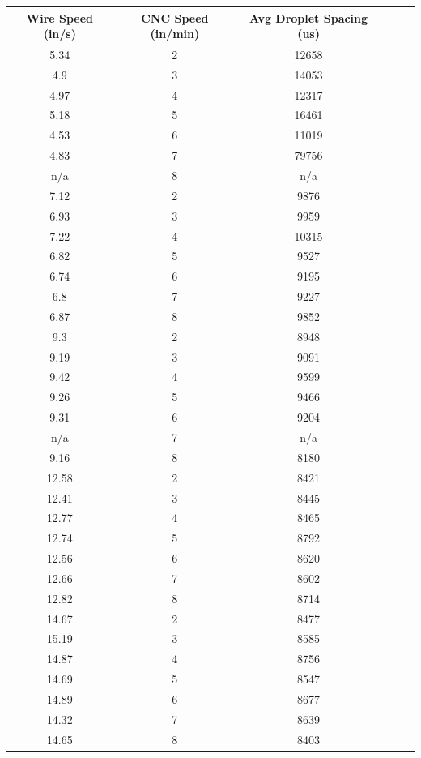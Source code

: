 \documentclass[12pt]{article}
\begin{document}
\begin{center}

\begin{tabular}{ |c|c|c|c|c|c| }


  \hline
  \textbf{Wire Speed (in/s)} & \textbf{CNC Speed (in/min)} & \textbf{Avg Droplet Spacing (us)} \\ \hline
5.34 &	2 &	12658 \\ \hline
4.9	& 3 &	14053 \\ \hline
4.97 &	4 &	12317 \\ \hline
5.18 &	5 &	16461 \\ \hline
4.53 &	6 &	11019 \\ \hline
4.83 &	7 &	79756 \\ \hline
n/a &	8 &	n/a \\ \hline \hline
7.12 &	2 &	9876 \\ \hline
6.93 &	3 &	9959 \\ \hline
7.22 &	4 &	10315 \\ \hline
6.82 &	5 &	9527 \\ \hline
6.74 &	6 &	9195 \\ \hline
6.8 &	7 &	9227 \\ \hline
6.87 &	8 &	9852 \\ \hline \hline
9.3 &	2 &	8948 \\ \hline
9.19 &	3 &	9091 \\ \hline
9.42 &	4 &	9599 \\ \hline
9.26 &	5 &	9466 \\ \hline
9.31 &	6 &	9204 \\ \hline
n/a &	7 &	n/a \\ \hline
9.16 &	8 &	8180 \\ \hline \hline
12.58 &	2 &	8421 \\ \hline
12.41 &	3 &	8445 \\ \hline
12.77 &	4 &	8465 \\ \hline
12.74 &	5 &	8792 \\ \hline
12.56 &	6 &	8620 \\ \hline
12.66 &	7 &	8602 \\ \hline
12.82 &	8 &	8714 \\ \hline \hline
14.67 &	2 &	8477 \\ \hline
15.19 &	3 &	8585 \\ \hline
14.87 &	4 &	8756 \\ \hline
14.69 &	5 &	8547 \\ \hline
14.89 &	6 &	8677 \\ \hline
14.32 &	7 &	8639 \\ \hline
14.65 &	8 &	8403 \\ \hline


 
\end{tabular}


\end{center}
\end{document}
